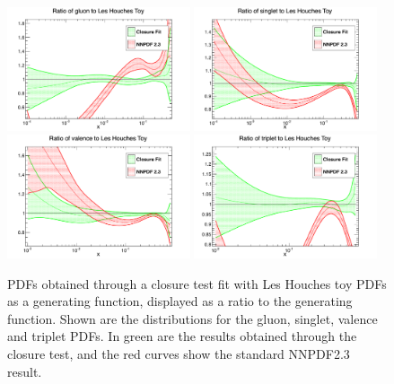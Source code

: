 \clearpage
\begin{figure}[h!]
\centering
\includegraphics[width=0.48\textwidth]{7-PostLHC/figs/gluon.pdf}
\includegraphics[width=0.48\textwidth]{7-PostLHC/figs/singlet.pdf}\\
\includegraphics[width=0.48\textwidth]{7-PostLHC/figs/valence.pdf}
\includegraphics[width=0.48\textwidth]{7-PostLHC/figs/triplet.pdf}
\caption[PDFs obtained through a Closure test fit with toy PDFs as a generating function]{PDFs obtained through a closure test fit with Les Houches toy PDFs as a generating function, displayed as a ratio to the generating function. Shown are the distributions for the gluon, singlet, valence and triplet PDFs. In green are the results obtained through the closure test, and the red curves show the standard NNPDF2.3 result.}
\label{fig:LHtoyclosure1}
\end{figure}
